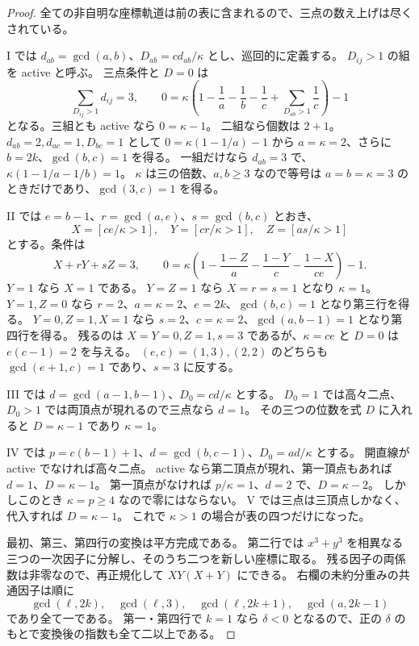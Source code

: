 \documentclass[11pt,a4paper]{ltjsarticle}
\numberwithin{equation}{section}
\theoremstyle{definition}
\begin{document}
\begin{proof}
全ての非自明な座標軌道は前の表に含まれるので、三点の数え上げは尽くされている。

I では $d_{ab}=\gcd(a,b)$、$D_{ab}=cd_{ab}/\kappa$ とし、巡回的に定義する。
$D_{ij}>1$ の組を active と呼ぶ。
三点条件と $D=0$ は
\[
 \sum_{D_{ij}>1}d_{ij}=3,\qquad
 0=\kappa\left(1-\frac1a-\frac1b-\frac1c+
             \sum_{D_{ab}>1}\frac1c\right)-1
\]
となる。三組とも active なら $0=\kappa-1$。
二組なら個数は $2+1$。$d_{ab}=2,d_{ac}=1,D_{bc}=1$ として
$0=\kappa(1-1/a)-1$ から $a=\kappa=2$、さらに $b=2k$、$\gcd(b,c)=1$ を得る。
一組だけなら $d_{ab}=3$ で、
$\kappa(1-1/a-1/b)=1$。
$\kappa$ は三の倍数、$a,b\ge3$ なので等号は $a=b=\kappa=3$ のときだけであり、$\gcd(3,c)=1$ を得る。

II では $e=b-1$、$r=\gcd(a,e)$、$s=\gcd(b,c)$ とおき、
\[
 X=[ce/\kappa>1],\quad Y=[cr/\kappa>1],\quad Z=[as/\kappa>1]
\]
とする。条件は
\[
 X+rY+sZ=3,\qquad
 0=\kappa\left(1-\frac{1-Z}{a}-\frac{1-Y}{c}-\frac{1-X}{ce}\right)-1.
\]
$Y=1$ なら $X=1$ である。
$Y=Z=1$ なら $X=r=s=1$ となり $\kappa=1$。
$Y=1,Z=0$ なら $r=2$、$a=\kappa=2$、$e=2k$、$\gcd(b,c)=1$ となり第三行を得る。
$Y=0,Z=1,X=1$ なら $s=2$、$c=\kappa=2$、$\gcd(a,b-1)=1$ となり第四行を得る。
残るのは $X=Y=0,Z=1,s=3$ であるが、$\kappa=ce$ と $D=0$ は $e(c-1)=2$ を与える。
$(e,c)=(1,3),(2,2)$ のどちらも $\gcd(e+1,c)=1$ であり、$s=3$ に反する。

III では $d=\gcd(a-1,b-1)$、$D_0=cd/\kappa$ とする。
$D_0=1$ では高々二点、$D_0>1$ では両頂点が現れるので三点なら $d=1$。
その三つの位数を式 $D$ に入れると $D=\kappa-1$ であり $\kappa=1$。

IV では $p=c(b-1)+1$、$d=\gcd(b,c-1)$、$D_0=ad/\kappa$ とする。
開直線が active でなければ高々二点。
active なら第二頂点が現れ、第一頂点もあれば $d=1$、$D=\kappa-1$。
第一頂点がなければ $p/\kappa=1$、$d=2$ で、$D=\kappa-2$。
しかしこのとき $\kappa=p\ge4$ なので零にはならない。
V では三点は三頂点しかなく、代入すれば $D=\kappa-1$。
これで $\kappa>1$ の場合が表の四つだけになった。

最初、第三、第四行の変換は平方完成である。
第二行では $x^3+y^3$ を相異なる三つの一次因子に分解し、そのうち二つを新しい座標に取る。
残る因子の両係数は非零なので、再正規化して $XY(X+Y)$ にできる。
右欄の未約分重みの共通因子は順に
\[
 \gcd(\ell,2k),\quad\gcd(\ell,3),\quad
 \gcd(\ell,2k+1),\quad\gcd(a,2k-1)
\]
であり全て一である。
第一・第四行で $k=1$ なら $\delta<0$ となるので、正の $\delta$ のもとで変換後の指数も全て二以上である。
\end{proof}
\end{document}
